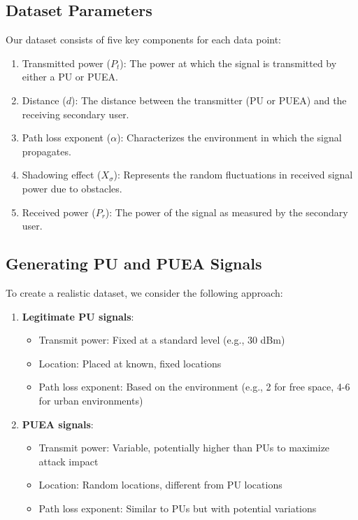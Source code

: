 \subsection{Dataset Parameters}
Our dataset consists of five key components for each data point:
\begin{enumerate}
    \item Transmitted power ($P_t$): The power at which the signal is transmitted by either a PU or PUEA.
    \item Distance ($d$): The distance between the transmitter (PU or PUEA) and the receiving secondary user.
    \item Path loss exponent ($\alpha$): Characterizes the environment in which the signal propagates.
    \item Shadowing effect ($X_\sigma$): Represents the random fluctuations in received signal power due to obstacles.
    \item Received power ($P_r$): The power of the signal as measured by the secondary user.
\end{enumerate}

\subsection{Generating PU and PUEA Signals}
To create a realistic dataset, we consider the following approach:

\begin{enumerate}
    \item \textbf{Legitimate PU signals}: 
    \begin{itemize}
        \item Transmit power: Fixed at a standard level (e.g., 30 dBm)
        \item Location: Placed at known, fixed locations
        \item Path loss exponent: Based on the environment (e.g., 2 for free space, 4-6 for urban environments)
    \end{itemize}
    
    \item \textbf{PUEA signals}: 
    \begin{itemize}
        \item Transmit power: Variable, potentially higher than PUs to maximize attack impact
        \item Location: Random locations, different from PU locations
        \item Path loss exponent: Similar to PUs but with potential variations
    \end{itemize}
\end{enumerate}

